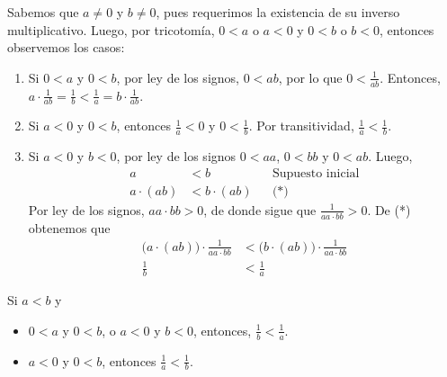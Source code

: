 \begin{enumerate}[label=\alph*)]
 Sabemos que $a\neq 0$ y $b\neq 0$, pues requerimos la existencia de su inverso multiplicativo. Luego, por tricotomía, $0<a$ o $a<0$ y $0<b$ o $b<0$, entonces observemos los casos: \begin{enumerate}[label=\roman*)]
  \item Si $0<a$ y $0<b$, por ley de los signos, $0<ab$, por lo que $0<\frac{1}{ab}$. Entonces, $a\cdot \frac{1}{ab} = \frac{1}{b} < \frac{1}{a} = b \cdot \frac{1}{ab}$.
  \item Si $a<0$ y $0<b$, entonces $\frac{1}{a}<0$ y $0<\frac{1}{b}$. Por transitividad, $\frac{1}{a}<\frac{1}{b}$.
  \item Si $a<0$ y $b<0$, por ley de los signos $0<a a$, $0<b b$ y $0<ab$. Luego,\begin{align*}
   a &< b && \text{Supuesto inicial}\\
   a \cdot (ab) &< b \cdot (ab) && \text{(*)}
  \end{align*} Por ley de los signos, $aa\cdot bb>0$, de donde sigue que $\frac{1}{aa\cdot bb}>0$. De (*) obtenemos que \begin{align*}
   \bigl(a \cdot (ab)\bigr) \cdot \frac{1}{aa\cdot bb} &< \bigl(b \cdot (ab)\bigr)\cdot \frac{1}{aa\cdot bb}\\
   \frac{1}{b} &< \frac{1}{a}
  \end{align*}
 \end{enumerate}
  Si $a<b$ y\begin{itemize}
  \item $0<a$ y $0<b$, o $a<0$ y $b<0$, entonces, $\frac{1}{b}<\frac{1}{a}$. %
  \item $a<0$ y $0<b$, entonces $\frac{1}{a}<\frac{1}{b}$.%
 \end{itemize}

\end{enumerate}
